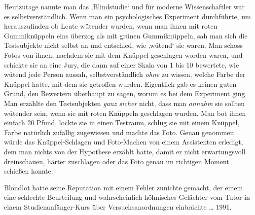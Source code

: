 Heutzutage nannte man das ‚Blindstudie‘ und für moderne Wissenschaftler war es selbstverständlich. Wenn man ein psychologisches Experiment durchführte, um herauszufinden ob Leute wütender wurden, wenn man ihnen mit roten Gummiknüppeln eins überzog als mit grünen Gummiknüppeln, sah man sich die Testsubjekte nicht selbst an und entschied, wie ‚wütend‘ sie waren. Man schoss Fotos von ihnen, nachdem sie mit dem Knüppel geschlagen worden waren, und schickte sie an eine Jury, die dann auf einer Skala von 1 bis 10 bewertete, wie wütend jede Person aussah, selbstverständlich \emph{ohne} zu wissen, welche Farbe der Knüppel hatte, mit dem sie getroffen wurden. Eigentlich gab es keinen guten Grund, den Bewertern überhaupt zu sagen, worum es bei dem Experiment ging. Man erzählte den Testsubjekten \emph{ganz sicher} nicht, dass man \emph{annahm} sie sollten wütender sein, wenn sie mit roten Knüppeln geschlagen wurden. Man bot ihnen einfach 20 Pfund, lockte sie in einen Testraum, schlug sie mit einem Knüppel, Farbe natürlich zufällig zugewiesen und machte das Foto. Genau genommen würde das Knüppel-Schlagen und Foto-Machen von einem Assistenten erledigt, dem man nichts von der Hypothese erzählt hatte, damit er nicht erwartungsvoll dreinschauen, härter zuschlagen oder das Foto genau im richtigen Moment schießen konnte.

Blondlot hatte seine Reputation mit einem Fehler zunichte gemacht, der einem eine schlechte Beurteilung und wahrscheinlich höhnisches Gelächter vom Tutor in einem Studienanfänger-Kurs über Versuchsanordnungen einbrächte … 1991.

